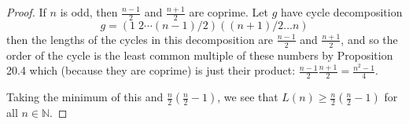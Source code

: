 \documentclass[11pt,dvipsnames]{book}
\numberwithin{figure}{section} %
\numberwithin{table}{section} %
\begin{document}
\begin{exercise}
\begin{solution}
\begin{proof}
If $n$ is odd, then $\frac{n-1}{2}$ and $\frac{n+1}{2}$ are coprime. Let $g$ have cycle decomposition 
\[
g=(1\; 2\cdots (n-1)/2)((n+1)/2  ... n)
\]
then the lengths of the cycles in this decomposition are $\frac{n-1}{2}$ and $\frac{n+1}{2}$, and so the order of the cycle is the least common multiple of these numbers by Proposition 20.4 which (because they are coprime) is just their product: $\frac{n-1}{2}\frac{n+1}{2}= \frac{n^2-1}{4}$. 

Taking the minimum of this and $\frac{n}{2}\left(\frac{n}{2}-1\right)$, we see that $L(n)\geq \frac{n}{2}\left(\frac{n}{2}-1\right) $ for all $n\in\mathbb{N}$.
\end{proof}
\end{solution}
\end{exercise}
\end{document}

